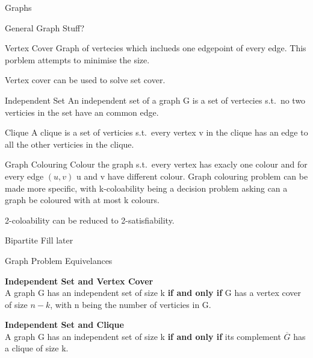 \documentclass[12pt, letterpaper]{article}
\begin{document}
\begin{section}{Graphs}

  \begin{subsection}{General Graph Stuff?}

    \begin{subsubsection}{Vertex Cover}
      Graph of vertecies which inclueds one edgepoint of every edge. This porblem
      attempts to minimise the size.

      Vertex cover can be used to solve set cover.
    \end{subsubsection}

    \begin{subsubsection}{Independent Set}
      An independent set of a graph G is a set of vertecies s.t.\ no two
      verticies in the set have an common edge.
    \end{subsubsection}

    \begin{subsubsection}{Clique}
      A clique is a set of verticies s.t.\ every vertex v in the clique
      has an edge to all the other verticies in the clique.
    \end{subsubsection}

    \begin{subsubsection}{Graph Colouring}
      Colour the graph s.t.\ every vertex has exacly one colour and
      for every edge \((u, v)\) u and v have different colour. Graph colouring
      problem can be made more specific, with k-coloability being a decision
      problem asking can a graph be coloured with at most k colours.

      2-coloability can be reduced to 2-satisfiability.
    \end{subsubsection}

    \begin{subsubsection}{Bipartite}
      Fill later
    \end{subsubsection}

    \begin{subsubsection}{Graph Problem Equivelances}

      \textbf{Independent Set and Vertex Cover} \\
      A graph G has an independent set of size k \textbf{if and only if}
      G has a vertex cover of size \(n - k\), with n being the number of
      verticies in G.

      \textbf{Independent Set and Clique} \\
      A graph G has an independent set of size k \textbf{if and only if}
      its complement \(\overline{G}\) has a clique of size k.


\end{subsubsection}
\end{subsection}
\end{section}
\end{document}
